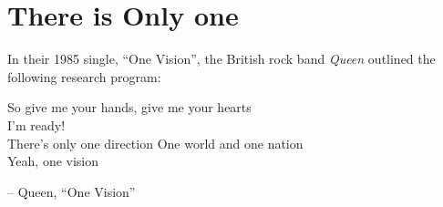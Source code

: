 \setcounter{section}{0}

\section{There is Only one}

In their 1985 single, \enquote{One Vision}, 
the British rock band \textit{Queen} outlined the 
following research program:
\begin{center}
  So give me your hands, give me your hearts\\
  I'm ready!\\
  There's only one direction
  One world and one nation\\
  Yeah, one vision
\end{center}
\begin{flushright}
  \small{
  -- Queen, ``One Vision''}
\end{flushright}
%
